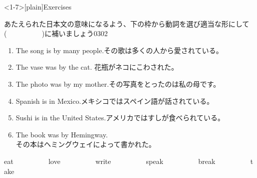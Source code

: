 \documentclass[aspectratio=169,xcolor={dvipsnames,table}]{beamer}
\newcommand{\myaudio}[1]{\href{#1}{\faVolumeUp}}
\begin{document}
\begin{frame}<1-7>[plain]{Exercises}

    {\small あたえられた日本文の意味になるよう、下の枠から動詞を選び適当な形にして(~~~~~~~~~~)に補いましょう}\hfill{\tiny 0302}\,{\scriptsize \myaudio{./audio/051_passive_05.mp3}
  }
  \begin{enumerate}
    \item The song is  by many people.\hfill{\small その歌は多くの人から愛されている。}
    \item The vase was  by the cat. \hfill{\small 花瓶がネコにこわされた。}
    \item The photo was  by my mother.\hfill{\small その写真をとったのは私の母です。}
    \item Spanish is  in Mexico.\hfill{\small メキシコではスペイン語が話されている。}
    \item Sushi is  in the United States.\hfill{\small アメリカではすしが食べられている。}
    \item The book was  by Hemingway. \\
          \hfill{\small その本はヘミングウェイによって書かれた。}
  \end{enumerate}

  \begin{tcolorbox}\centering
    eat~~~~~~~~~~love~~~~~~~~~~write~~~~~~~~~~speak~~~~~~~~~~break~~~~~~~~~~take
  \end{tcolorbox}
\end{frame}
\end{document}
